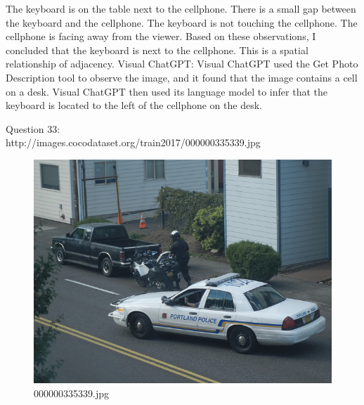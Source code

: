 \begin{enumerate}
        The keyboard is on the table next to the cellphone.
        There is a small gap between the keyboard and the cellphone.
        The keyboard is not touching the cellphone.
        The cellphone is facing away from the viewer.
        Based on these observations, I concluded that the keyboard is next to the cellphone. This is a spatial relationship of adjacency.
        \subitem Visual ChatGPT: Visual ChatGPT used the Get Photo Description tool to observe the image, and it found that the image contains a cell on a desk. Visual ChatGPT then used its language model to infer that the keyboard is located to the left of the cellphone on the desk.
    \end{enumerate}
    Question 33:\\http://images.cocodataset.org/train2017/000000335339.jpg
    \begin{figure}[h]
        \centering
        \includegraphics[width=0.8\linewidth]{../image set/easy/000000335339.jpg}
        \caption{000000335339.jpg}
    \end{figure} 
